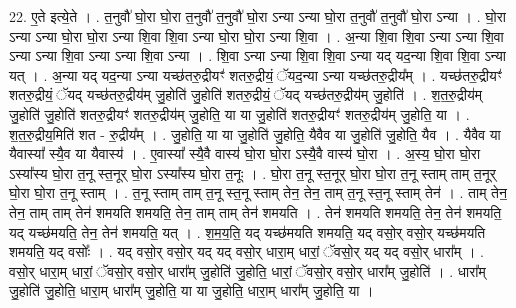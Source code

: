 \documentclass[17pt]{extarticle}
\begin{document}
22. ए॒ते इत्ये॒ते । . त॒नुवौ॑ घो॒रा घो॒रा त॒नुवौ॑ त॒नुवौ॑ घो॒रा ऽन्या ऽन्या घो॒रा त॒नुवौ॑ त॒नुवौ॑ घो॒रा ऽन्या । . घो॒रा ऽन्या ऽन्या घो॒रा घो॒रा ऽन्या शि॒वा शि॒वा ऽन्या घो॒रा घो॒रा ऽन्या शि॒वा । . अ॒न्या शि॒वा शि॒वा ऽन्या ऽन्या शि॒वा ऽन्या ऽन्या शि॒वा ऽन्या ऽन्या शि॒वा ऽन्या । . शि॒वा ऽन्या ऽन्या शि॒वा शि॒वा ऽन्या यद् यद॒न्या शि॒वा शि॒वा ऽन्या यत् । . अ॒न्या यद् यद॒न्या ऽन्या यच्छ॑तरु॒द्रीयꣳ॑ शतरु॒द्रीयं॒ ॅयद॒न्या ऽन्या यच्छ॑तरु॒द्रीय᳚म् । . यच्छ॑तरु॒द्रीयꣳ॑ शतरु॒द्रीयं॒ ॅयद् यच्छ॑तरु॒द्रीय॑म् जु॒होति॑ जु॒होति॑ शतरु॒द्रीयं॒ ॅयद् 
यच्छ॑तरु॒द्रीय॑म् जु॒होति॑ । . श॒त॒रु॒द्रीय॑म् जु॒होति॑ जु॒होति॑ शतरु॒द्रीयꣳ॑ शतरु॒द्रीय॑म् जु॒होति॒ या या जु॒होति॑ शतरु॒द्रीयꣳ॑ शतरु॒द्रीय॑म् जु॒होति॒ या । . श॒त॒रु॒द्रीय॒मिति॑ शत - रु॒द्रीय᳚म् । . जु॒होति॒ या या जु॒होति॑ जु॒होति॒ यैवैव या जु॒होति॑ जु॒होति॒ यैव । . यैवैव या यैवास्या᳚ स्यै॒व या यैवास्य॑ । . ए॒वास्या᳚ स्यै॒वै वास्य॑ घो॒रा घो॒रा ऽस्यै॒वै वास्य॑ घो॒रा । . अ॒स्य॒ घो॒रा घो॒रा ऽस्या᳚स्य घो॒रा त॒नू स्त॒नूर् घो॒रा ऽस्या᳚स्य घो॒रा त॒नूः । . घो॒रा त॒नू स्त॒नूर् घो॒रा घो॒रा त॒नू स्ताम् ताम् त॒नूर् घो॒रा घो॒रा त॒नू स्ताम् । . त॒नू स्ताम् ताम् त॒नू स्त॒नू स्ताम् तेन॒ तेन॒ ताम् त॒नू स्त॒नू स्ताम् तेन॑ । . ताम् तेन॒ तेन॒ ताम् ताम् तेन॑ शमयति शमयति॒ तेन॒ ताम् ताम् तेन॑ शमयति । . तेन॑ शमयति शमयति॒ तेन॒ तेन॑ शमयति॒ यद् यच्छ॑मयति॒ तेन॒ तेन॑ शमयति॒ यत् । . श॒म॒य॒ति॒ यद् यच्छ॑मयति शमयति॒ यद् वसो॒र् वसो॒र् यच्छ॑मयति शमयति॒ यद् वसोः᳚ । . यद् वसो॒र् वसो॒र् यद् यद् वसो॒र् धारा॒म् धारां॒ ॅवसो॒र् यद् यद् वसो॒र् धारा᳚म् । . वसो॒र् धारा॒म् धारां॒ ॅवसो॒र् वसो॒र् धारा᳚म् जु॒होति॑ जु॒होति॒ धारां॒ ॅवसो॒र् वसो॒र् धारा᳚म् जु॒होति॑ । . धारा᳚म् जु॒होति॑ जु॒होति॒ धारा॒म् धारा᳚म् जु॒होति॒ या या जु॒होति॒ धारा॒म् धारा᳚म् जु॒होति॒ या । \newline
\end{document}
